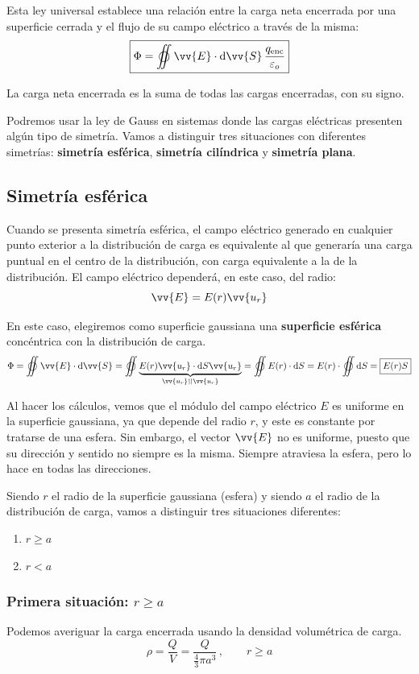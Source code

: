 \documentclass[a4paper]{book}
\numberwithin{figure}{chapter}
\numberwithin{equation}{chapter}
\newcommand{\subtext}[1]{_{\text{#1}}}
\renewcommand{\vec}[1]{\vv{{#1}}}
\newcommand{\parallelvec}{\upharpoonleft \! \upharpoonright}
\begin{document}
Esta ley universal establece una relación entre la carga neta encerrada por una superficie cerrada y el flujo de su campo eléctrico a través de la misma:
\[\boxed{\Phi = \varoiint \vec{E}\cdot \dd\vec{S} \frac{q\subtext{enc}}{\varepsilon_o}}\]

La carga neta encerrada es la suma de todas las cargas encerradas, con su signo.

Podremos usar la ley de Gauss en sistemas donde las cargas eléctricas presenten algún tipo de simetría. Vamos a distinguir tres situaciones con diferentes simetrías: \textbf{simetría esférica}, \textbf{simetría cilíndrica} y \textbf{simetría plana}.

\subsection{Simetría esférica}
Cuando se presenta simetría esférica, el campo eléctrico generado en cualquier punto exterior a la distribución de carga es equivalente al que generaría una carga puntual en el centro de la distribución, con carga equivalente a la de la distribución. El campo eléctrico dependerá, en este caso, del radio:
\[\vec{E}=E(r)\vec{u_r}\]

En este caso, elegiremos como superficie gaussiana una \textbf{superficie esférica} concéntrica con la distribución de carga.
\[\Phi = \varoiint \vec{E}\cdot \dd \vec{S} = \varoiint \underbrace{E(r)\vec{u_r}\cdot \dd S \vec{u_r}}_{\vec{u_r} \parallelvec \vec{u_r}} = \varoiint E(r)\cdot \dd S = E(r)\cdot \varoiint \dd S  = \boxed{E(r)S}\]

Al hacer los cálculos, vemos que el módulo del campo eléctrico $E$ es uniforme en la superficie gaussiana, ya que depende del radio $r$, y este es constante por tratarse de una esfera. Sin embargo, el vector $\vec{E}$ no es uniforme, puesto que su dirección y sentido no siempre es la misma. Siempre atraviesa la esfera, pero lo hace en todas las direcciones.

Siendo $r$ el radio de la superficie gaussiana (esfera) y siendo $a$ el radio de la distribución de carga, vamos a distinguir tres situaciones diferentes:
\begin{enumerate}
	\item $r\geq a$
	\item $r<a$
\end{enumerate}

\subsubsection{Primera situación: $r\geq a$}
Podemos averiguar la carga encerrada usando la densidad volumétrica de carga.
\[\rho = \frac{Q}{V} = \frac{Q}{\frac{4}{3}\pi a^3} \, , \qquad r\geq a\]
\end{document}
